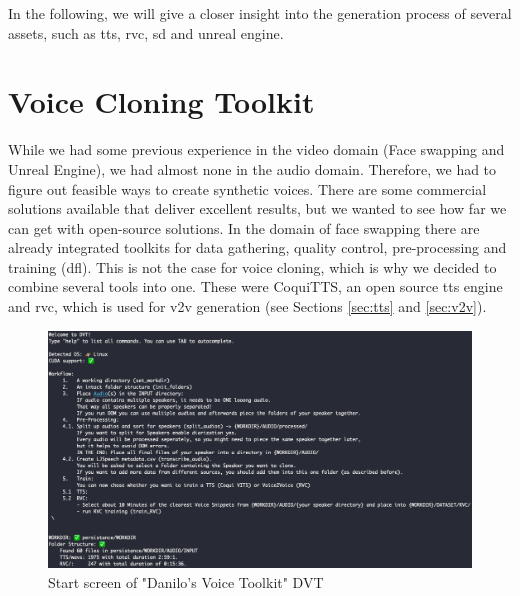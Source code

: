 \documentclass[
  a4paper,  %
  twoside,  %
  bibliography=totoc,
  headsepline,
  cleardoublepage=empty,
  parskip=half,
  draft=false
]{scrbook}
\begin{document}
In the following, we will give a closer insight into the generation process of several assets, such as \gls{tts}, \gls{rvc}, \gls{sd} and unreal engine.

\section{Voice Cloning Toolkit}
\label{sec:dvt}
While we had some previous experience in the video domain (Face swapping and Unreal Engine), we had almost none in the audio domain. Therefore, we had to figure out feasible ways to create synthetic voices. There are some commercial solutions available that deliver excellent results, but we wanted to see how far we can get with open-source solutions. In the domain of face swapping there are already integrated toolkits for data gathering, quality control, pre-processing and training (\gls{dfl}). This is not the case for voice cloning, which is why we decided to combine several tools into one. These were CoquiTTS, an open source \gls{tts} engine and \gls{rvc}, which is used for \gls{v2v} generation (see Sections \ref{sec:tts} and \ref{sec:v2v}). 

\begin{figure}[h]
  \centering
  \includegraphics[width=1\textwidth]{./graphics/images/dvt-screen.png}
  \caption{Start screen of "Danilo's Voice Toolkit" DVT}
  \label{fig:dvt-interface}
\end{figure}
\end{document}
